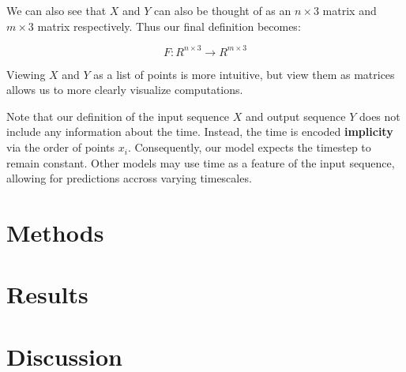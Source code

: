 \documentclass{article}
\begin{document}
We can also see that $X$ and $Y$ can also be thought of as an $n \times 3$
matrix and $m \times 3$ matrix respectively. Thus our final definition becomes:

$$ F: R^{n \times 3} \to R^{m \times 3} $$

Viewing $X$ and $Y$ as a list of points is more intuitive, but view them as 
matrices allows us to more clearly visualize computations.

Note that our definition of the input sequence $X$ and output sequence $Y$ does 
not include any information about the time. Instead, the time is encoded
\textbf{implicity} via the order of points $x_i$. Consequently, our model
expects the timestep to remain constant. Other models may use time as a feature
of the input sequence, allowing for predictions accross varying timescales.

\section{Methods}
\section{Results}
\section{Discussion}
\end{document}
